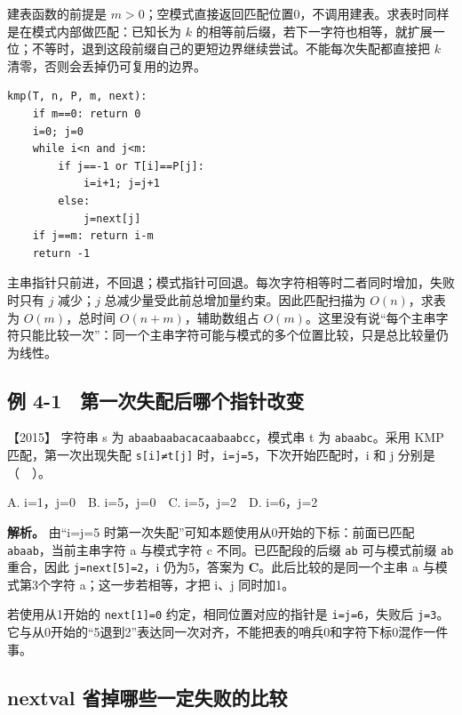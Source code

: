 建表函数的前提是 \(m>0\)；空模式直接返回匹配位置0，不调用建表。求表时同样是在模式内部做匹配：已知长为 \(k\) 的相等前后缀，若下一字符也相等，就扩展一位；不等时，退到这段前缀自己的更短边界继续尝试。不能每次失配都直接把 \(k\) 清零，否则会丢掉仍可复用的边界。

\par\medskip\noindent
\begin{minipage}{\linewidth}
\begin{verbatim}
kmp(T, n, P, m, next):
    if m==0: return 0
    i=0; j=0
    while i<n and j<m:
        if j==-1 or T[i]==P[j]:
            i=i+1; j=j+1
        else:
            j=next[j]
    if j==m: return i-m
    return -1
\end{verbatim}
\end{minipage}\par\medskip

主串指针只前进，不回退；模式指针可回退。每次字符相等时二者同时增加，失败时只有 \(j\) 减少；\(j\) 总减少量受此前总增加量约束。因此匹配扫描为 \(O(n)\)，求表为 \(O(m)\)，总时间 \(O(n+m)\)，辅助数组占 \(O(m)\)。这里没有说``每个主串字符只能比较一次''：同一个主串字符可能与模式的多个位置比较，只是总比较量仍为线性。

\subsection{例 4-1　第一次失配后哪个指针改变}\label{ds-ex4-1}

\noindent{}【2015】 字符串 s 为 \texttt{abaabaabacacaabaabcc}，模式串 t 为 \texttt{abaabc}。采用 KMP 匹配，第一次出现失配 \texttt{s{[}i{]}≠t{[}j{]}} 时，\texttt{i=j=5}，下次开始匹配时，i 和 j 分别是（　）。

A. i=1，j=0　B. i=5，j=0　C. i=5，j=2　D. i=6，j=2


\textbf{解析。} 由``i=j=5 时第一次失配''可知本题使用从0开始的下标：前面已匹配 \texttt{abaab}，当前主串字符 a 与模式字符 c 不同。已匹配段的后缀 \texttt{ab} 可与模式前缀 \texttt{ab} 重合，因此 \texttt{j=next{[}5{]}=2}，i 仍为5，答案为 \textbf{C}。此后比较的是同一个主串 a 与模式第3个字符 a；这一步若相等，才把 i、j 同时加1。

若使用从1开始的 \texttt{next{[}1{]}=0} 约定，相同位置对应的指针是 \texttt{i=j=6}，失败后 \texttt{j=3}。它与从0开始的``5退到2''表达同一次对齐，不能把表的哨兵0和字符下标0混作一件事。

\subsection{nextval 省掉哪些一定失败的比较}\label{ds-c04-h90}

